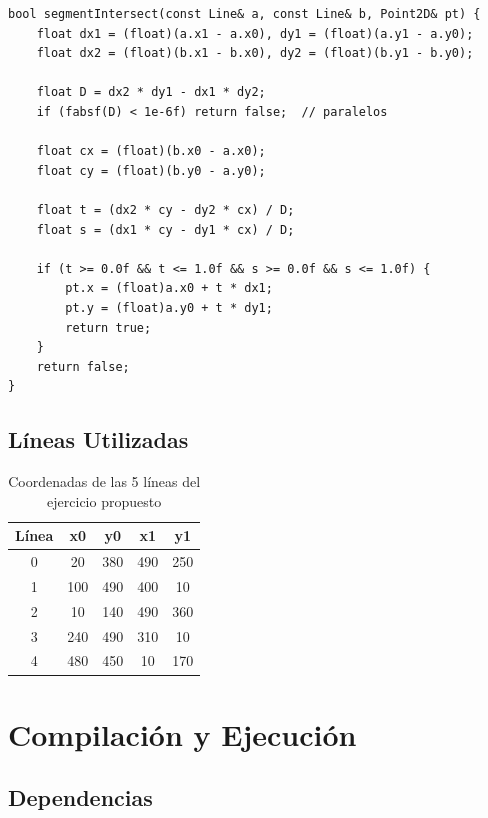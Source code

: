\documentclass[12pt,a4paper]{article}
\begin{document}
\begin{lstlisting}[caption={Función de intersección paramétrica}]
bool segmentIntersect(const Line& a, const Line& b, Point2D& pt) {
    float dx1 = (float)(a.x1 - a.x0), dy1 = (float)(a.y1 - a.y0);
    float dx2 = (float)(b.x1 - b.x0), dy2 = (float)(b.y1 - b.y0);

    float D = dx2 * dy1 - dx1 * dy2;
    if (fabsf(D) < 1e-6f) return false;  // paralelos

    float cx = (float)(b.x0 - a.x0);
    float cy = (float)(b.y0 - a.y0);

    float t = (dx2 * cy - dy2 * cx) / D;
    float s = (dx1 * cy - dy1 * cx) / D;

    if (t >= 0.0f && t <= 1.0f && s >= 0.0f && s <= 1.0f) {
        pt.x = (float)a.x0 + t * dx1;
        pt.y = (float)a.y0 + t * dy1;
        return true;
    }
    return false;
}
\end{lstlisting}

\subsection{Líneas Utilizadas}

\begin{table}[H]
  \centering
  \begin{tabular}{ccccc}
    \toprule
    \textbf{Línea} & \textbf{x0} & \textbf{y0} & \textbf{x1} & \textbf{y1} \\
    \midrule
    0 &  20 & 380 & 490 & 250 \\
    1 & 100 & 490 & 400 &  10 \\
    2 &  10 & 140 & 490 & 360 \\
    3 & 240 & 490 & 310 &  10 \\
    4 & 480 & 450 &  10 & 170 \\
    \bottomrule
  \end{tabular}
  \caption{Coordenadas de las 5 líneas del ejercicio propuesto}
\end{table}

\section{Compilación y Ejecución}

\subsection{Dependencias}
\end{document}
